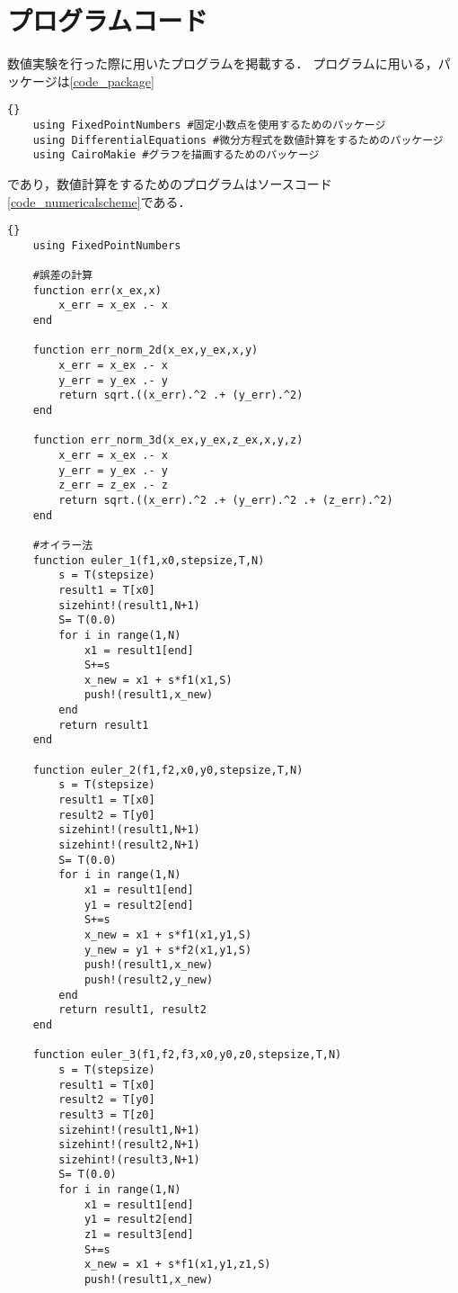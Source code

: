 \section{プログラムコード}
数値実験を行った際に用いたプログラムを掲載する．
プログラムに用いる，パッケージは\ref{code_package}
\begin{lstlisting}[caption=package,label=code_package]{}
    using FixedPointNumbers #固定小数点を使用するためのパッケージ
    using DifferentialEquations #微分方程式を数値計算をするためのパッケージ
    using CairoMakie #グラフを描画するためのパッケージ
\end{lstlisting}
であり，数値計算をするためのプログラムはソースコード\ref{code_numericalscheme}である．
\begin{lstlisting}[caption =\text{numerical\_scheme.jl}, label =code_numericalscheme]{}
    using FixedPointNumbers

    #誤差の計算
    function err(x_ex,x)
        x_err = x_ex .- x
    end

    function err_norm_2d(x_ex,y_ex,x,y)
        x_err = x_ex .- x
        y_err = y_ex .- y
        return sqrt.((x_err).^2 .+ (y_err).^2)
    end

    function err_norm_3d(x_ex,y_ex,z_ex,x,y,z)
        x_err = x_ex .- x
        y_err = y_ex .- y
        z_err = z_ex .- z
        return sqrt.((x_err).^2 .+ (y_err).^2 .+ (z_err).^2)
    end

    #オイラー法
    function euler_1(f1,x0,stepsize,T,N) 
        s = T(stepsize)
        result1 = T[x0]
        sizehint!(result1,N+1)
        S= T(0.0)
        for i in range(1,N)
            x1 = result1[end]
            S+=s
            x_new = x1 + s*f1(x1,S)
            push!(result1,x_new)
        end
        return result1
    end

    function euler_2(f1,f2,x0,y0,stepsize,T,N)
        s = T(stepsize)
        result1 = T[x0]
        result2 = T[y0]
        sizehint!(result1,N+1)
        sizehint!(result2,N+1)
        S= T(0.0)
        for i in range(1,N)
            x1 = result1[end]
            y1 = result2[end]
            S+=s
            x_new = x1 + s*f1(x1,y1,S)
            y_new = y1 + s*f2(x1,y1,S)
            push!(result1,x_new)
            push!(result2,y_new)
        end
        return result1, result2
    end

    function euler_3(f1,f2,f3,x0,y0,z0,stepsize,T,N)
        s = T(stepsize)
        result1 = T[x0]
        result2 = T[y0]
        result3 = T[z0]
        sizehint!(result1,N+1)
        sizehint!(result2,N+1)
        sizehint!(result3,N+1)
        S= T(0.0)
        for i in range(1,N)
            x1 = result1[end]
            y1 = result2[end]
            z1 = result3[end]
            S+=s
            x_new = x1 + s*f1(x1,y1,z1,S)
            push!(result1,x_new)


\end{lstlisting}
